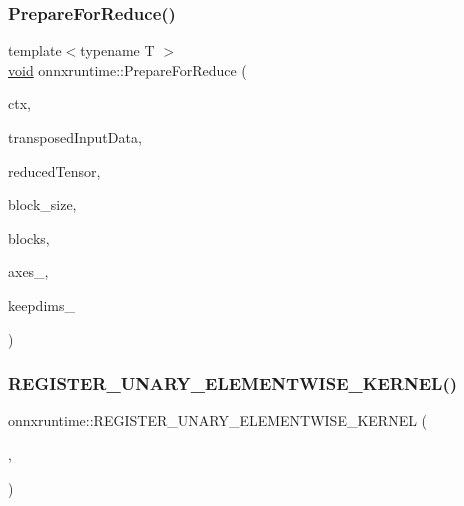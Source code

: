 \mbox{\label{namespaceonnxruntime_a13f102913e6ac947fb6df1a6aea1ec25}} 
\subsubsection{\texorpdfstring{Prepare\+For\+Reduce()}{PrepareForReduce()}}
{\footnotesize\ttfamily template$<$typename T $>$ \\
\mbox{\hyperlink{mlasi_8h_a88f941d423cb2a819b70a1358982b1a6}{void}} onnxruntime\+::\+Prepare\+For\+Reduce (\begin{DoxyParamCaption}\item[{\mbox{\hyperlink{classonnxruntime_1_1OpKernelContext}{Op\+Kernel\+Context}} $\ast$}]{ctx,  }\item[{std\+::vector$<$ T $>$ \&}]{transposed\+Input\+Data,  }\item[{\mbox{\hyperlink{classonnxruntime_1_1Tensor}{Tensor}} $\ast$$\ast$}]{reduced\+Tensor,  }\item[{int64\+\_\+t \&}]{block\+\_\+size,  }\item[{int64\+\_\+t \&}]{blocks,  }\item[{const std\+::vector$<$ int64\+\_\+t $>$ \&}]{axes\+\_\+,  }\item[{bool}]{keepdims\+\_\+ }\end{DoxyParamCaption})}

\mbox{\label{namespaceonnxruntime_a7e412e2961944ae7d864ec4b682f8c92}} 
\subsubsection{\texorpdfstring{R\+E\+G\+I\+S\+T\+E\+R\+\_\+\+U\+N\+A\+R\+Y\+\_\+\+E\+L\+E\+M\+E\+N\+T\+W\+I\+S\+E\+\_\+\+K\+E\+R\+N\+E\+L()}{REGISTER\_UNARY\_ELEMENTWISE\_KERNEL()}\hspace{0.1cm}{\footnotesize\ttfamily [1/23]}}
{\footnotesize\ttfamily onnxruntime\+::\+R\+E\+G\+I\+S\+T\+E\+R\+\_\+\+U\+N\+A\+R\+Y\+\_\+\+E\+L\+E\+M\+E\+N\+T\+W\+I\+S\+E\+\_\+\+K\+E\+R\+N\+EL (\begin{DoxyParamCaption}\item[{\mbox{\hyperlink{classonnxruntime_1_1Elu}{Elu}}}]{,  }\item[{6}]{ }\end{DoxyParamCaption})}

